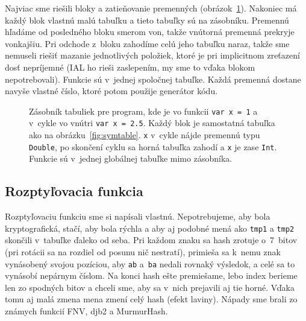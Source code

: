 \documentclass[a4paper,11pt]{article}
\newcommand{\id}[1]{\texttt{#1}}
\begin{document}
Najviac sme riešili bloky a zatieňovanie premenných (obrázok~\ref{fig:scopes}). Nakoniec má každý blok
vlastnú malú tabuľku a tieto tabuľky sú na zásobníku. Premennú hľadáme od
posledného bloku smerom von, takže vnútorná premenná prekryje vonkajšiu. Pri
odchode z~bloku zahodíme celú jeho tabuľku naraz, takže sme nemuseli riešiť
mazanie jednotlivých položiek, ktoré je pri implicitnom zreťazení dosť
nepríjemné (IAL ho rieši zaslepením, my sme to vďaka blokom nepotrebovali). Funkcie sú v~jednej spoločnej tabuľke. Každá premenná dostane
navyše vlastné číslo, ktoré potom použije generátor kódu.

\begin{figure}[H]
  \centering
  \caption{Zásobník tabuliek pre program, kde je vo funkcii \id{var x = 1}
    a v~cykle vo vnútri \id{var x = 2.5}. Každý blok je samostatná tabuľka
    ako na obrázku~\ref{fig:symtable}. \id{x} v~cykle nájde premennú typu
    \id{Double}, po skončení cyklu sa horná tabuľka zahodí a \id{x} je zase
    \id{Int}. Funkcie sú v~jednej globálnej tabuľke mimo zásobníka.}
  \label{fig:scopes}
\end{figure}

\subsection{Rozptyľovacia funkcia}\label{sec:hash}
Rozptyľovaciu funkciu sme si napísali vlastnú. Nepotrebujeme, aby bola
kryptografická, stačí, aby bola rýchla a aby aj podobné mená ako \id{tmp1}
a \id{tmp2} skončili v~tabuľke ďaleko od seba. Pri každom znaku sa hash
zrotuje o~7~bitov (pri rotácii sa na rozdiel od posunu nič nestratí),
primieša sa k~nemu znak vynásobený svojou pozíciou, aby \id{ab} a~\id{ba}
nedali rovnaký výsledok, a celé sa to vynásobí nepárnym číslom. Na konci hash
ešte premiešame, lebo index berieme len zo spodných bitov a chceli sme, aby sa
v~nich prejavili aj tie horné. Vďaka tomu aj malá zmena mena zmení celý hash
(efekt laviny). Nápady sme brali zo známych funkcií FNV, djb2
a MurmurHash.
\end{document}
